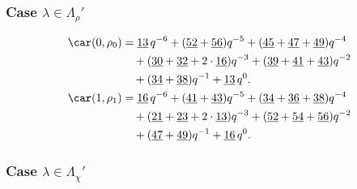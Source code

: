 \subsubsection{Case $\lambda\in \Lambda_\rho'$}

\begin{align*}
	\car(0,\rho_{0})
	&=\underline{13}\,q^{-6}+(\underline{52}+\underline{56})q^{-5}+(\underline{45}+\underline{47}+\underline{49})q^{-4}\\
	&\quad+(\underline{30}+\underline{32}+2\cdot\underline{16})q^{-3}+(\underline{39}+\underline{41}+\underline{43})q^{-2}\\
	&\quad+(\underline{34}+\underline{38})q^{-1}+\underline{13}\,q^0.\\
	\car(1,\rho_{1})
	&=\underline{16}\,q^{-6}+(\underline{41}+\underline{43})q^{-5}+(\underline{34}+\underline{36}+\underline{38})q^{-4}\\
	&\quad+(\underline{21}+\underline{23}+2\cdot\underline{13})q^{-3}+(\underline{52}+\underline{54}+\underline{56})q^{-2}\\
	&\quad+(\underline{47}+\underline{49})q^{-1}+\underline{16}\,q^0.
\end{align*}

\subsubsection{Case $\lambda\in \Lambda_\chi'$}

